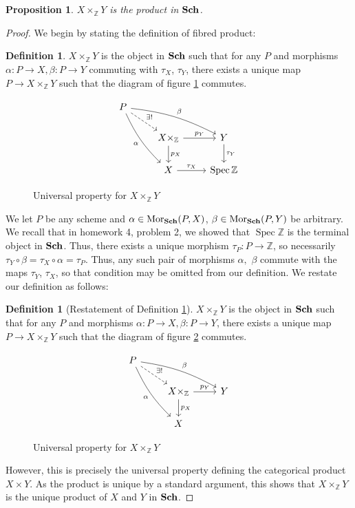 \documentclass[english,letter,doublesided]{article}
\DeclareMathOperator{\spec}{Spec}
\newcommand{\mor}{\mathrm{Mor}}
\newcommand{\ZZ}{\mathbb{Z}}
\newcommand{\prob}[1]{\setcounter{section}{#1-1}\section{}}
\newtheorem*{prop*}{Proposition}
\theoremstyle{remark}
\theoremstyle{definition}
\newtheorem{defn}[thm]{Definition}
\newcommand{\cat}[1]{{\mathrm{\bf{#1}}}}
\begin{document}
%
%
%
\prob{7}\begin{prop*}
	$X\times_{\ZZ}Y$ is the product in $\cat{Sch}$. 
\end{prop*}
\begin{proof}
We begin by stating the definition of fibred product:
\begin{defn}\label{7defn:fp}
 $X\times_\ZZ Y$ is the object in $\cat{Sch}$ such that for any $P$ and morphisms $\alpha:P\to X,\beta:P\to Y$ commuting with $\tau_X$, $\tau_Y$, there exists a unique map $P\to X\times_\ZZ Y$ such that the diagram of figure \ref{7fpd} commutes.
	\begin{figure}[h!]
		$$\begin{tikzcd}
		P\arrow[dr,dashrightarrow,"\exists!"]\arrow[ddr,bend right =10, "\alpha",swap]\arrow[drr,bend left=10, "\beta"]&&\\
		&X\times_\ZZ\arrow[d,"p_X"]\arrow[r,"p_Y"] &Y\arrow[d,"\tau_Y"]\\
		&X\arrow[r,"\tau_X"]&\spec \ZZ
		\end{tikzcd}$$\caption{Universal property for $X\times_\ZZ Y$\label{7fpd}}
	\end{figure}\end{defn}

We let $P$ be any scheme and $\alpha\in \mor_\cat{Sch}(P,X)$, $\beta\in \mor_\cat{Sch}(P,Y)$ be arbitrary. We recall that in homework 4, problem 2, we showed that $\spec \ZZ$ is the terminal object in $\cat{Sch}$. Thus, there exists a unique morphism $\tau_P:P\to \ZZ$, so necessarily $\tau_Y\circ \beta=\tau_X\circ \alpha=\tau_P$. Thus, any such pair of morphisms $\alpha,$ $\beta$ commute with the maps $\tau_Y$, $\tau_X$, so that condition may be omitted from our definition. We restate our definition as follows:
\begin{defn}[Restatement of Definition \ref{7fpd}]
	 $X\times_\ZZ Y$ is the object in $\cat{Sch}$ such that for any $P$ and morphisms $\alpha:P\to X,\beta:P\to Y$, there exists a unique map $P\to X\times_\ZZ Y$ such that the diagram of figure \ref{7fpd2} commutes.
	\begin{figure}[h!]
		$$\begin{tikzcd}
		P\arrow[dr,dashrightarrow,"\exists!"]\arrow[ddr,bend right =10, "\alpha",swap]\arrow[drr,bend left=10, "\beta"]&&\\
		&X\times_\ZZ\arrow[d,"p_X"]\arrow[r,"p_Y"] &Y\\
		&X&
		\end{tikzcd}$$\caption{Universal property for $X\times_\ZZ Y$\label{7fpd2}}
\end{figure}
\end{defn}
However, this is precisely the universal property defining the categorical product $X\times Y$. As the product is unique by a standard argument, this shows that $X\times_\ZZ Y$ is the unique product of $X$ and $Y$ in $\cat{Sch}$.
\end{proof}
\end{document}
